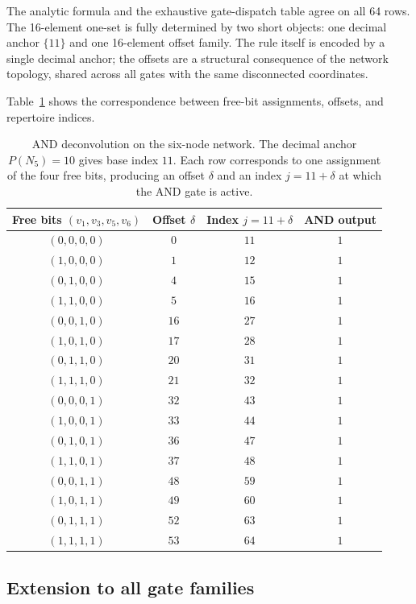 \documentclass[11pt]{article}
\begin{document}
The analytic formula and the exhaustive gate-dispatch table agree on all
64 rows.  The 16-element one-set is fully determined by two short objects:
one decimal anchor $\{11\}$ and one 16-element offset family.  The rule itself is
encoded by a single decimal anchor; the offsets are a structural
consequence of the network topology, shared across all gates with the same
disconnected coordinates.

Table~\ref{tab:and-deconv} shows the correspondence between free-bit
assignments, offsets, and repertoire indices.

\begin{table}[h]
\centering
\small
\begin{tabular}{cccc}
\toprule
Free bits $(v_1,v_3,v_5,v_6)$ & Offset $\delta$ & Index $j=11+\delta$ & AND output \\
\midrule
$(0,0,0,0)$ & $0$  & $11$ & $1$ \\
$(1,0,0,0)$ & $1$  & $12$ & $1$ \\
$(0,1,0,0)$ & $4$  & $15$ & $1$ \\
$(1,1,0,0)$ & $5$  & $16$ & $1$ \\
$(0,0,1,0)$ & $16$ & $27$ & $1$ \\
$(1,0,1,0)$ & $17$ & $28$ & $1$ \\
$(0,1,1,0)$ & $20$ & $31$ & $1$ \\
$(1,1,1,0)$ & $21$ & $32$ & $1$ \\
$(0,0,0,1)$ & $32$ & $43$ & $1$ \\
$(1,0,0,1)$ & $33$ & $44$ & $1$ \\
$(0,1,0,1)$ & $36$ & $47$ & $1$ \\
$(1,1,0,1)$ & $37$ & $48$ & $1$ \\
$(0,0,1,1)$ & $48$ & $59$ & $1$ \\
$(1,0,1,1)$ & $49$ & $60$ & $1$ \\
$(0,1,1,1)$ & $52$ & $63$ & $1$ \\
$(1,1,1,1)$ & $53$ & $64$ & $1$ \\
\bottomrule
\end{tabular}
\caption{AND deconvolution on the six-node network.  The decimal anchor $P(N_5)=10$
gives base index $11$.  Each row corresponds to one assignment of the four
free bits, producing an offset $\delta$ and an index $j=11+\delta$ at which
the AND gate is active.}
\label{tab:and-deconv}
\end{table}


\subsection{Extension to all gate families}\label{sec:all-gates}
\end{document}
